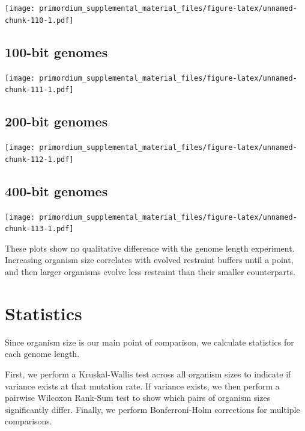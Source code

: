 \documentclass[
]{book}
\begin{document}
\texttt{[image: primordium\_supplemental\_material\_files/figure-latex/unnamed-chunk-110-1.pdf]}

\hypertarget{bit-genomes-7}{%
\subsection{100-bit genomes}\label{bit-genomes-7}}

\texttt{[image: primordium\_supplemental\_material\_files/figure-latex/unnamed-chunk-111-1.pdf]}

\hypertarget{bit-genomes-8}{%
\subsection{200-bit genomes}\label{bit-genomes-8}}

\texttt{[image: primordium\_supplemental\_material\_files/figure-latex/unnamed-chunk-112-1.pdf]}

\hypertarget{bit-genomes-9}{%
\subsection{400-bit genomes}\label{bit-genomes-9}}

\texttt{[image: primordium\_supplemental\_material\_files/figure-latex/unnamed-chunk-113-1.pdf]}

These plots show no qualitative difference with the genome length experiment.
Increasing organism size correlates with evolved restraint buffers until a point, and then larger organisms evolve less restraint than their smaller counterparts.

\hypertarget{statistics-6}{%
\section{Statistics}\label{statistics-6}}

Since organism size is our main point of comparison, we calculate statistics for each genome length.

First, we perform a Kruskal-Wallis test across all organism sizes to indicate if variance exists at that mutation rate.
If variance exists, we then perform a pairwise Wilcoxon Rank-Sum test to show which pairs of organism sizes significantly differ.
Finally, we perform Bonferroni-Holm corrections for multiple comparisons.
\end{document}
